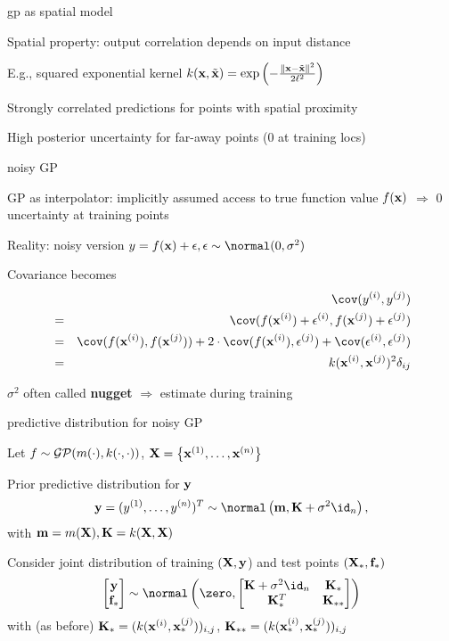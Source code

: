\documentclass[11pt,compress,t,notes=noshow, xcolor=table]{beamer}
\begin{document}
\begin{framei}[sep=L]{gp as spatial model}
\item Spatial property: output correlation depends on input distance
\item E.g., squared exponential kernel $k(\xv, \tilde{\xv}) = \exp \left(-\frac{\| \xv - \tilde{\xv} \|^2}{2\ls^2} \right)$
\item Strongly correlated predictions for points with spatial proximity
\item High posterior uncertainty for far-away points (0 at training locs)
\vfill
{}
\end{framei}

\begin{framei}[sep=L]{noisy GP}
\item GP as interpolator: implicitly assumed access to true function value $\fx$ $\Rightarrow$ 0 uncertainty at training points
\item Reality: noisy version
$y = \fx + \eps, \eps \sim\normal(0, \sigma^2)$
\item Covariance becomes 
\begin{eqnarray*} 
&&\cov(y^{(i)}, y^{(j)}) \\ &=&  \cov (f(\xi) + \epsilon^{(i)}, f(\xi[j]) + \epsilon^{(j)}) \\
&=& \cov(f(\xi), f(\xi[j])) + 2 \cdot \cov(f(\xi), \epsilon^{(j)}) + \cov(\epsilon^{(i)}, \epsilon^{(j)}) 
\\ &=& \kxij + \sigma^2 \delta_{ij}
\end{eqnarray*}
\item $\sigma^2$ often called \textbf{nugget} $\Rightarrow$ estimate during training
\end{framei}

\begin{framei}[sep=L]{predictive distribution for noisy GP}
\item Let $f \sim \gpmk$, $\Xmat = \xdat$
\item Prior predictive distribution for $\yv$
$$
\yv = (\yi[1], \dots, \yi[n])^T
\sim \normal\left(\mv, \Kmat + \sigma^2 \id_n \right),
$$
with $\mv = m(\Xmat), \Kmat = k(\Xmat, \Xmat)$
\item Consider joint distribution of training $(\Xmat, \yv$) and test points $(\Xmat_*, \fv_*)$
$$
\begin{bmatrix} \yv \\ \fv_* \end{bmatrix} \sim  
\normal\left(\zero, \begin{bmatrix} \Kmat + \sigma^2 \id_n & \Kstar \\ \Kstar^T & \Kstarstar \end{bmatrix}\right)
$$
with (as before) $\Kstar = (k(\xi, \xstar^{(j)}))_{i,j}$, $\Kstarstar = (k(\xi[i]_*, \xi[j]_*))_{i,j}$
\end{framei}
\end{document}
